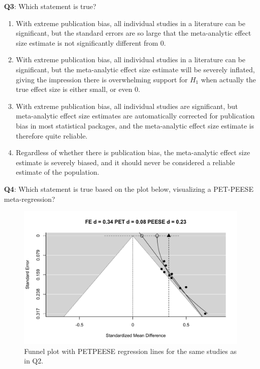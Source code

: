 \documentclass[
  oneside]{book}
\providecommand{\tightlist}{%
  \setlength{\itemsep}{0pt}\setlength{\parskip}{0pt}}
\begin{document}
\textbf{Q3}: Which statement is true?

\begin{enumerate}
\def\labelenumi{\Alph{enumi})}
\tightlist
\item
  With extreme publication bias, all individual studies in a literature can be significant, but the standard errors are so large that the meta-analytic effect size estimate is not significantly different from 0.
\item
  With extreme publication bias, all individual studies in a literature can be significant, but the meta-analytic effect size estimate will be severely inflated, giving the impression there is overwhelming support for \(H_1\) when actually the true effect size is either small, or even 0.
\item
  With extreme publication bias, all individual studies are significant, but
  meta-analytic effect size estimates are automatically corrected for publication bias in most statistical packages, and the meta-analytic effect size estimate is therefore quite reliable.
\item
  Regardless of whether there is publication bias, the meta-analytic effect size estimate is severely biased, and it should never be considered a reliable estimate of the population.
\end{enumerate}

\textbf{Q4}: Which statement is true based on the plot below, visualizing a PET-PEESE meta-regression?

\begin{figure}

{\centering \includegraphics[width=1\linewidth]{12-bias_files/figure-latex/petpeeseq4-1} 

}

\caption{Funnel plot with PETPEESE regression lines for the same studies as in Q2.}\label{fig:petpeeseq4}
\end{figure}
\end{document}
